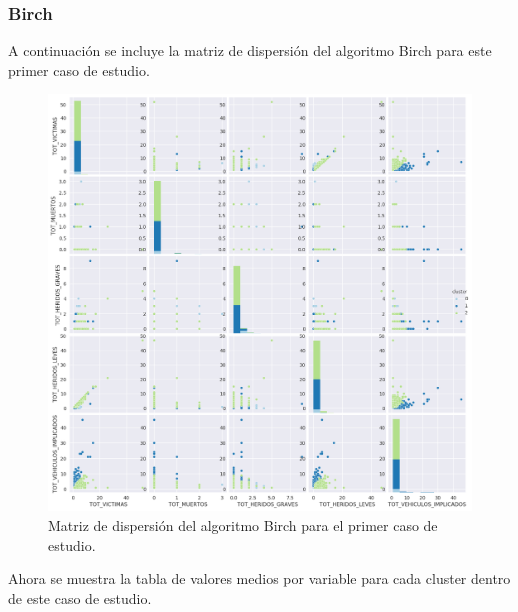 	\subsubsection{Birch}
	A continuación se incluye la matriz de dispersión del algoritmo Birch para este primer caso de estudio.
	
	\begin{figure}[H]
		\centering
		\includegraphics[scale=0.5]{plots/Birch-HighwayAccidents-ScatterMatrix.png}
		\caption{Matriz de dispersión del algoritmo Birch para el primer caso de estudio.}
	\end{figure}

	Ahora se muestra la tabla de valores medios por variable para cada cluster dentro de este caso de estudio.
	
	\begin{table}[H]
		\centering
		\caption{Tabla de valores medios del algoritmo Birch para el primer caso de estudio.}
	\end{table}

